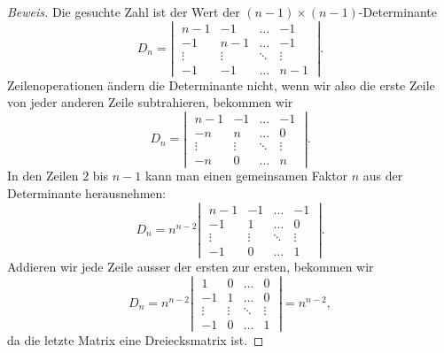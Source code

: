 \begin{proof}[Beweis]
Die gesuchte Zahl ist der Wert der $(n-1)\times(n-1)$-Determinante
\[
D_n
=
\left|\;
\begin{matrix}
n-1   &  -1  & \dots & -1 \\
 -1   & n-1  & \dots & -1 \\
\vdots&\vdots&\ddots &\vdots\\
 -1   &  -1  &\dots  &n-1
\end{matrix}
\;\right|.
\]
Zeilenoperationen ändern die Determinante nicht, wenn wir also die
erste Zeile von jeder anderen Zeile subtrahieren, bekommen wir
\[
D_n=
\left|\;
\begin{matrix}
n-1   &  -1  & \dots & -1 \\
 -n   & n    & \dots &  0 \\
\vdots&\vdots&\ddots &\vdots\\
 -n   &   0  &\dots  &n  
\end{matrix}
\;\right|.
\]
In den Zeilen $2$ bis $n-1$ kann man einen gemeinsamen Faktor $n$
aus der Determinante herausnehmen:
\[
D_n=
n^{n-2}
\left|\;
\begin{matrix}
n-1   &  -1  & \dots & -1 \\
 -1   & 1    & \dots &  0 \\
\vdots&\vdots&\ddots &\vdots\\
 -1   &   0  &\dots  &1  
\end{matrix}
\;\right|.
\]
Addieren wir jede Zeile ausser der ersten zur ersten, bekommen wir
\[
D_n=
n^{n-2}
\left|\;
\begin{matrix}
  1   &   0  & \dots &  0 \\
 -1   & 1    & \dots &  0 \\
\vdots&\vdots&\ddots &\vdots\\
 -1   &   0  &\dots  &1  
\end{matrix}
\;\right|=n^{n-2},
\]
da die letzte Matrix eine Dreiecksmatrix ist.
\end{proof}
